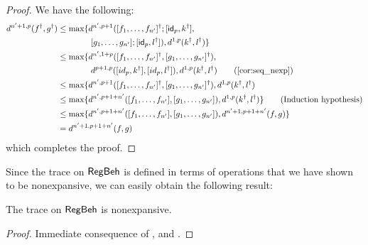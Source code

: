 \begin{proof}
	We have the following:
	\begin{align*}
		d^{n' + 1, p}(f^\dagger, g^\dagger) &\leq \max \{d^{n', p + 1}(\lc f_1, \dots, f_{n'}\rc^\dagger; \lc \id_p,k^\dagger\rc,\\&\qquad\qquad  \lc g_1, \dots, g_{n'}\rc; \lc \id_p , l^\dagger\rc), d^{1,p}(k^\dagger, l^\dagger)\}\\
		&\leq \max \{d^{n', 1 + p}(\lc f_1, \dots, f_{n'}\rc^\dagger, \lc g_1, \dots, g_{n'}\rc^\dagger),\\&\qquad\qquad  d^{p + 1, p}(\lc id_p , k^\dagger\rc, \lc id_p ,l^\dagger\rc),  d^{1,p}(k^\dagger, l^\dagger) \tag{\Cref{cor:seq_nexp}}\\
		&\leq \max \{d^{n', p + 1}(\lc f_1, \dots, f_{n'}\rc^\dagger, \lc g_1, \dots, g_{n'}\rc^\dagger), d^{1,p}(k^\dagger, l^\dagger)\\
		&\leq  \max \{d^{n', p + 1 + n'}(\lc f_1, \dots, f_{n'}\rc, \lc g_1, \dots, g_{n'}\rc ), d^{1,p}(k^\dagger, l^\dagger)\} \tag{Induction hypothesis}\\
		&\leq \max \{d^{n', p + 1 + n'}(\lc f_1, \dots, f_{n'}\rc, \lc g_1, \dots, g_{n'}\rc ),  d^{n' + 1, p + 1 + n'}(f,g)\} \\
		&=  d^{n' + 1, p + 1 + n'}(f,g)
	\end{align*}
	which completes the proof.
\end{proof}
Since the trace on $\mathsf{RegBeh}$ is defined in terms of operations that we have shown to be nonexpansive, we can easily obtain the following result:
\begin{corollary}\label{cor:trace_nonexpansive}
	The trace on $\mathsf{RegBeh}$ is nonexpansive.
\end{corollary}
\begin{proof}
	Immediate consequence of ,  and .
\end{proof}
